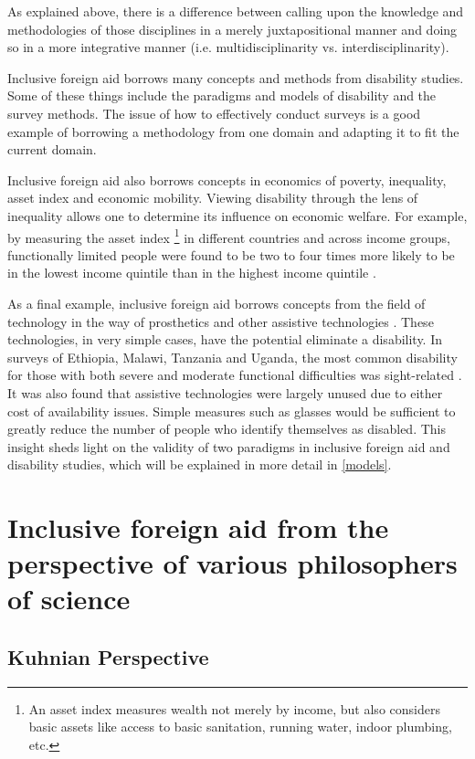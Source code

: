 \documentclass[a4paper]{article}
\begin{document}
As explained above, there is a difference between calling upon the knowledge and
methodologies of those disciplines in a merely juxtapositional manner and
doing so in a more integrative manner (i.e. multidisciplinarity vs.
interdisciplinarity).

Inclusive foreign aid borrows many concepts and methods from disability
studies. Some of these things include the paradigms and models of disability
and the survey methods. The issue of how to effectively conduct surveys is a
good example of borrowing a methodology from one domain and adapting it to fit
the current domain. 

Inclusive foreign aid also borrows concepts in economics of poverty,
inequality, asset index and economic mobility. Viewing disability through the
lens of inequality allows one to determine its influence on economic welfare.
For example, by measuring the asset index \footnote{An asset index measures
wealth not merely by income, but also considers basic assets like access to
basic sanitation, running water, indoor plumbing, etc.} in different countries
and across income groups, functionally limited people were found to be two to
four times more likely to be in the lowest income quintile than in the highest
income quintile \citep{mitra2018disability}.  

As a final example, inclusive foreign aid borrows concepts from the field of
technology in the way of prosthetics and other assistive technologies
\citep{roulstone2016disability}. These technologies, in very simple cases,
have the potential eliminate a disability. In surveys of Ethiopia, Malawi,
Tanzania and Uganda, the most common disability for those with both severe and
moderate functional difficulties was sight-related
\citep{mitra2018disability}. It was also found that assistive technologies
were largely unused due to either cost of availability issues. Simple measures
such as glasses would be sufficient to greatly reduce the number of people who
identify themselves as disabled. This insight sheds light on the validity of
two paradigms in inclusive foreign aid and disability studies, which will be
explained in more detail in \autoref{models}.


\newpage
\section{Inclusive foreign aid from the perspective of various philosophers of
science}

\subsection{Kuhnian Perspective}
\end{document}
